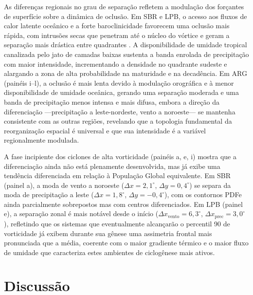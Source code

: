 As diferenças regionais no grau de separação refletem a modulação dos forçantes de superfície sobre a dinâmica de oclusão. Em SBR e LPB, o acesso aos fluxos de calor latente oceânico e a forte baroclinicidade favorecem uma oclusão mais rápida, com intrusões secas que penetram até o núcleo do vórtice e geram a separação mais drástica entre quadrantes \citep{gozzo2013air}. A disponibilidade de umidade tropical canalizada pelo jato de camadas baixas \citep{vera2002cold} sustenta a banda enrolada de precipitação com maior intensidade, incrementando a densidade no quadrante sudeste e alargando a zona de alta probabilidade na maturidade e na decadência. Em ARG (painéis i--l), a oclusão é mais lenta devido à modulação orográfica e à menor disponibilidade de umidade oceânica, gerando uma separação moderada e uma banda de precipitação menos intensa e mais difusa, embora a direção da diferenciação —precipitação a leste-nordeste, vento a noroeste— se mantenha consistente com as outras regiões, revelando que a topologia fundamental da reorganização espacial é universal e que sua intensidade é a variável regionalmente modulada.

A fase incipiente dos ciclones de alta vorticidade (painéis a, e, i) mostra que a diferenciação ainda não está plenamente desenvolvida, mas já exibe uma tendência diferenciada em relação à População Global equivalente. Em SBR (painel a), a moda de vento a noroeste ($\Delta x = 2{,}1^{\circ}$, $\Delta y = 0{,}4^{\circ}$) se separa da moda de precipitação a leste ($\Delta x = 1{,}8^{\circ}$, $\Delta y = -0{,}4^{\circ}$), com os contornos PDFe ainda parcialmente sobrepostos mas com centros diferenciados. Em LPB (painel e), a separação zonal é mais notável desde o início ($\Delta x_{\text{vento}} = 6{,}3^{\circ}$, $\Delta x_{\text{prec}} = 3{,}0^{\circ}$), refletindo que os sistemas que eventualmente alcançarão o percentil 90 de vorticidade já exibem durante sua gênese uma assimetria frontal mais pronunciada que a média, coerente com o maior gradiente térmico e o maior fluxo de umidade que caracteriza estes ambientes de ciclogênese mais ativos.

\section{Discussão}\label{sec:discusion_prototipos}


